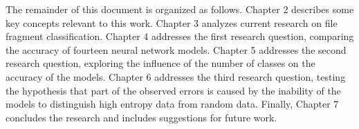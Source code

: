 
The remainder of this document is organized as follows.
Chapter 2 describes some key concepts relevant to this work. 
Chapter 3 analyzes current research on file fragment classification.
Chapter 4 addresses the first research question, comparing the accuracy of fourteen neural network models.
Chapter 5 addresses the second research question, exploring the influence of the number of classes on the accuracy of the models.
Chapter 6 addresses the third research question, testing the hypothesis that part of the observed errors is caused by the inability of the models to distinguish high entropy data from random data.    
Finally, Chapter 7 concludes the research and includes suggestions for future work.
